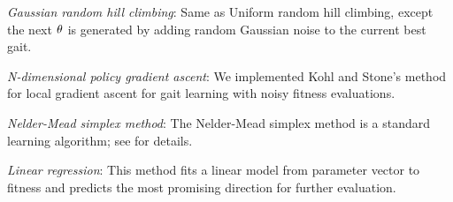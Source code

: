 \emph{Gaussian random hill climbing}: Same as Uniform random hill climbing, except the next
  ${\theta}$ is generated by adding random Gaussian noise to the
  current best gait.

\emph{N-dimensional policy gradient ascent}: We implemented Kohl
  and Stone's \cite{kohl} method for local gradient ascent for gait
  learning with noisy fitness evaluations.


\emph{Nelder-Mead simplex method}: The Nelder-Mead simplex
  method is a standard learning algorithm; see \cite{nm} for details.

\emph{Linear regression}: This method fits a linear model from
parameter vector to fitness and predicts the most promising direction
for further evaluation.



